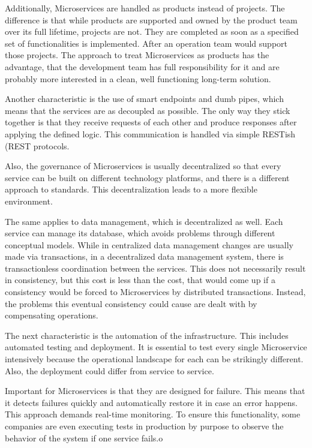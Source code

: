 \documentclass[12pt,english,a4paper,oneside,,tablecaptionabove]{scrbook}
\begin{document}
Additionally, Microservices are handled as products instead of projects.
The difference is that while products are supported and owned by the
product team over its full lifetime, projects are not. They are
completed as soon as a specified set of functionalities is implemented.
After an operation team would support those projects. The approach to
treat Microservices as products has the advantage, that the development
team has full responsibility for it and are probably more interested in
a clean, well functioning long-term solution.

Another characteristic is the use of smart endpoints and dumb pipes,
which means that the services are as decoupled as possible. The only way
they stick together is that they receive requests of each other and
produce responses after applying the defined logic. This communication
is handled via simple \acs{REST}ish (\acl{REST} protocols.

Also, the governance of Microservices is usually decentralized so that
every service can be built on different technology platforms, and there
is a different approach to standards. This decentralization leads to a
more flexible environment.

The same applies to data management, which is decentralized as well.
Each service can manage its database, which avoids problems through
different conceptual models. While in centralized data management
changes are usually made via transactions, in a decentralized data
management system, there is transactionless coordination between the
services. This does not necessarily result in consistency, but this cost
is less than the cost, that would come up if a consistency would be
forced to Microservices by distributed transactions. Instead, the
problems this eventual consistency could cause are dealt with by
compensating operations.

The next characteristic is the automation of the infrastructure. This
includes automated testing and deployment. It is essential to test every
single Microservice intensively because the operational landscape for
each can be strikingly different. Also, the deployment could differ from
service to service.

Important for Microservices is that they are designed for failure. This
means that it detects failures quickly and automatically restore it in
case an error happens. This approach demands real-time monitoring. To
ensure this functionality, some companies are even executing tests in
production by purpose to observe the behavior of the system if one
service fails.o
\end{document}
